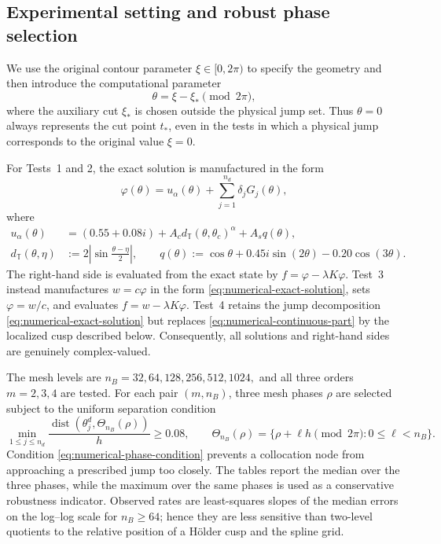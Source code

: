 \documentclass[11pt,a4paper]{amsart}
\theoremstyle{plain}
\theoremstyle{definition}
\theoremstyle{remark}
\begin{document}
\subsection{Experimental setting and robust phase selection}

We use the original contour parameter $\xi\in[0,2\pi)$ to specify the
geometry and then introduce the computational parameter
\[
        \theta=\xi-\xi_*\pmod{2\pi},
\]
where the auxiliary cut $\xi_*$ is chosen outside the physical jump set.
Thus $\theta=0$ always represents the cut point $t_*$, even in the tests in
which a physical jump corresponds to the original value $\xi=0$.

For Tests~1 and 2, the exact solution is manufactured in the form
\begin{equation}\label{eq:numerical-exact-solution}
 \varphi(\theta)=u_\alpha(\theta)
       +\sum_{j=1}^{n_d}\delta_jG_j(\theta),
\end{equation}
where
\begin{align}
 u_\alpha(\theta)
  &=(0.55+0.08i)+A_c d_{\mathbb T}(\theta,\theta_c)^\alpha
       +A_s q(\theta),\label{eq:numerical-continuous-part}\\
 d_{\mathbb T}(\theta,\eta)
  &:=2\left|\sin\frac{\theta-\eta}{2}\right|,\qquad
 q(\theta):=\cos\theta+0.45i\sin(2\theta)-0.20\cos(3\theta).
\end{align}
The right-hand side is evaluated from the exact state by
$f=\varphi-\lambda K\varphi$.  Test~3 instead manufactures
$w=c\varphi$ in the form \eqref{eq:numerical-exact-solution}, sets
$\varphi=w/c$, and evaluates $f=w-\lambda K\varphi$.  Test~4 retains the
jump decomposition \eqref{eq:numerical-exact-solution} but replaces
\eqref{eq:numerical-continuous-part} by the localized cusp described below.
Consequently, all solutions and right-hand sides are genuinely complex-valued.

The mesh levels are
$
        n_B=32,64,128,256,512,1024,
$
and all three orders $m=2,3,4$ are tested.  For each pair $(m,n_B)$, three
mesh phases $\rho$ are selected subject to the uniform separation condition
\begin{equation}\label{eq:numerical-phase-condition}
 \min_{1\le j\le n_d}
 \frac{\operatorname{dist}(\theta_j^d,\Theta_{n_B}(\rho))}{h}
 \ge 0.08,
 \qquad
 \Theta_{n_B}(\rho)=\{\rho+\ell h\pmod{2\pi}:0\le\ell<n_B\}.
\end{equation}
Condition \eqref{eq:numerical-phase-condition} prevents a collocation node from approaching a prescribed jump too closely.  The tables report the median over the three phases, while the maximum over
the same phases is used as a conservative robustness indicator.  Observed
rates are least-squares slopes of the median errors on the log--log scale for
$n_B\ge64$; hence they are less sensitive than two-level quotients to the
relative position of a H\"older cusp and the spline grid.
\end{document}
